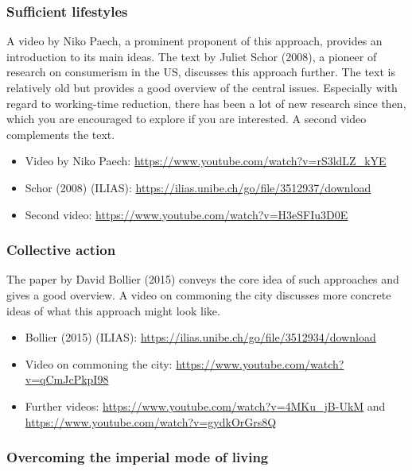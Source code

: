 \documentclass[
  british,
  a4paper,
  DIV=11,
  numbers=noendperiod,
  oneside,
  openany]{scrreprt}
\providecommand{\tightlist}{%
  \setlength{\itemsep}{0pt}\setlength{\parskip}{0pt}}
\begin{document}
\subsubsection{Sufficient lifestyles}\label{sufficient-lifestyles-1}

A video by Niko Paech, a prominent proponent of this approach, provides
an introduction to its main ideas. The text by Juliet Schor (2008), a
pioneer of research on consumerism in the US, discusses this approach
further. The text is relatively old but provides a good overview of the
central issues. Especially with regard to working-time reduction, there
has been a lot of new research since then, which you are encouraged to
explore if you are interested. A second video complements the text.

\begin{itemize}
\tightlist
\item
  Video by Niko Paech: \url{https://www.youtube.com/watch?v=rS3ldLZ_kYE}
\item
  Schor (2008) (ILIAS):
  \url{https://ilias.unibe.ch/go/file/3512937/download}
\item
  Second video: \url{https://www.youtube.com/watch?v=H3eSFIu3D0E}
\end{itemize}

\subsubsection{Collective action}\label{collective-action-1}

The paper by David Bollier (2015) conveys the core idea of such
approaches and gives a good overview. A video on commoning the city
discusses more concrete ideas of what this approach might look like.

\begin{itemize}
\tightlist
\item
  Bollier (2015) (ILIAS):
  \url{https://ilias.unibe.ch/go/file/3512934/download}
\item
  Video on commoning the city:
  \url{https://www.youtube.com/watch?v=qCmJcPkpI98}
\item
  Further videos: \url{https://www.youtube.com/watch?v=4MKu_jB-UkM} and
  \url{https://www.youtube.com/watch?v=gydkOrGrs8Q}
\end{itemize}

\subsubsection{Overcoming the imperial mode of
living}\label{overcoming-the-imperial-mode-of-living-1}
\end{document}
